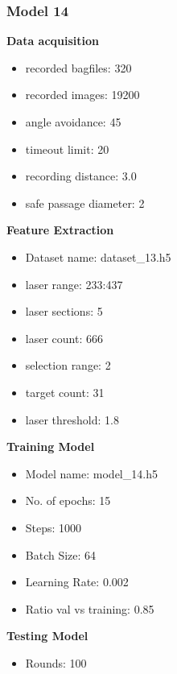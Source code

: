 \subsubsection{Model 14\label{model_14} }
\begin{multicols}{2}\textbf{Data acquisition}
\begin{itemize}
\setlength\itemsep{0.1em}
\item recorded bagfiles: 320
\item recorded images: 19200
\item angle avoidance: 45
\item timeout limit: 20
\item recording distance: 3.0
\item safe passage diameter: 2
\end{itemize}
\textbf{Feature Extraction}
\begin{itemize}
\setlength\itemsep{0.1em}
\item Dataset name: dataset\_13.h5
\item  laser range: 233:437
\item  laser sections: 5
\item  laser count: 666
\item  selection range: 2
\item  target count: 31
\item  laser threshold: 1.8
\end{itemize}
\textbf{Training Model}
\begin{itemize}
\setlength\itemsep{0.1em}
\item  Model name: model\_14.h5
\item  No. of epochs: 15
\item  Steps: 1000
\item  Batch Size: 64
\item  Learning Rate: 0.002
\item  Ratio val vs training: 0.85
\end{itemize}
\textbf{Testing Model}
\begin{itemize}
\setlength\itemsep{0.1em}
\item Rounds: 100
\newline
\newline
\newline
\newline
\newline
\newline
\newline
\newline
\end{itemize}

\end{multicols}
